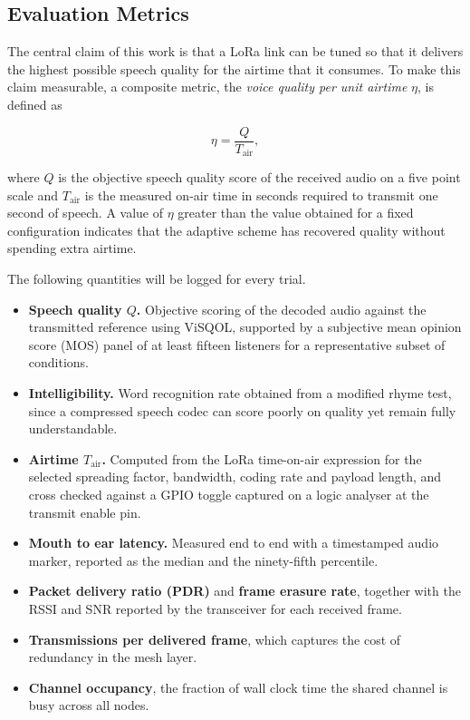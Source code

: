 \documentclass[a4paper,10pt]{article}
\begin{document}
\subsection{Evaluation Metrics}

The central claim of this work is that a LoRa link can be tuned so
that it delivers the highest possible speech quality for the airtime
that it consumes. To make this claim measurable, a composite metric,
the \emph{voice quality per unit airtime} $\eta$, is defined as

\begin{equation}
\eta = \frac{Q}{T_{\mathrm{air}}},
\end{equation}

\noindent where $Q$ is the objective speech quality score of the
received audio on a five point scale and $T_{\mathrm{air}}$ is the
measured on-air time in seconds required to transmit one second of
speech. A value of $\eta$ greater than the value obtained for a fixed
configuration indicates that the adaptive scheme has recovered
quality without spending extra airtime.

The following quantities will be logged for every trial.

\begin{itemize}
\item \textbf{Speech quality $Q$.} Objective scoring of the decoded
      audio against the transmitted reference using ViSQOL, supported
      by a subjective mean opinion score (MOS) panel of at least
      fifteen listeners for a representative subset of conditions.
\item \textbf{Intelligibility.} Word recognition rate obtained from a
      modified rhyme test, since a compressed speech codec can score
      poorly on quality yet remain fully understandable.
\item \textbf{Airtime $T_{\mathrm{air}}$.} Computed from the LoRa
      time-on-air expression for the selected spreading factor,
      bandwidth, coding rate and payload length, and cross checked
      against a GPIO toggle captured on a logic analyser at the
      transmit enable pin.
\item \textbf{Mouth to ear latency.} Measured end to end with a
      timestamped audio marker, reported as the median and the
      ninety-fifth percentile.
\item \textbf{Packet delivery ratio (PDR)} and \textbf{frame erasure
      rate}, together with the RSSI and SNR reported by the
      transceiver for each received frame.
\item \textbf{Transmissions per delivered frame}, which captures the
      cost of redundancy in the mesh layer.
\item \textbf{Channel occupancy}, the fraction of wall clock time the
      shared channel is busy across all nodes.
\end{itemize}
\end{document}
